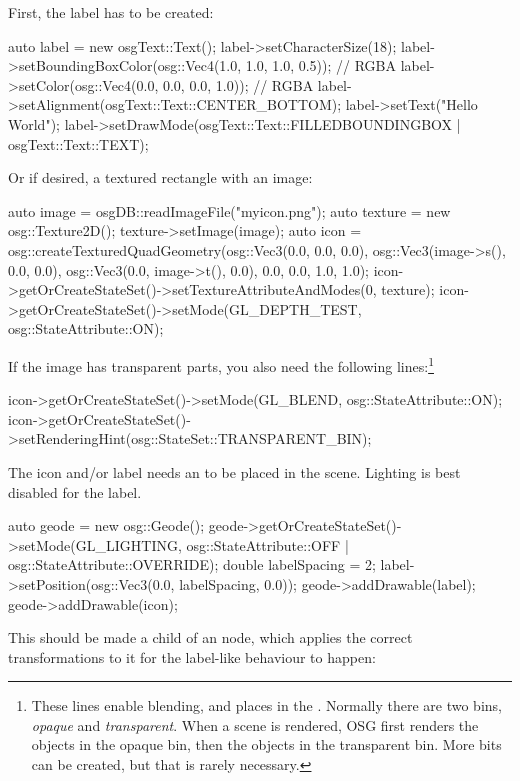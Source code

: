 First, the label has to be created:

\begin{cpp}
auto label = new osgText::Text();
label->setCharacterSize(18);
label->setBoundingBoxColor(osg::Vec4(1.0, 1.0, 1.0, 0.5)); // RGBA
label->setColor(osg::Vec4(0.0, 0.0, 0.0, 1.0)); // RGBA
label->setAlignment(osgText::Text::CENTER_BOTTOM);
label->setText("Hello World");
label->setDrawMode(osgText::Text::FILLEDBOUNDINGBOX | osgText::Text::TEXT);
\end{cpp}

Or if desired, a textured rectangle with an image:

\begin{cpp}
auto image = osgDB::readImageFile("myicon.png");
auto texture = new osg::Texture2D();
texture->setImage(image);
auto icon = osg::createTexturedQuadGeometry(osg::Vec3(0.0, 0.0, 0.0),
    osg::Vec3(image->s(), 0.0, 0.0), osg::Vec3(0.0, image->t(), 0.0),
    0.0, 0.0, 1.0, 1.0);
icon->getOrCreateStateSet()->setTextureAttributeAndModes(0, texture);
icon->getOrCreateStateSet()->setMode(GL_DEPTH_TEST, osg::StateAttribute::ON);
\end{cpp}

If the image has transparent parts, you also need the following lines:\footnote{These lines
enable blending, and places  in the . Normally there are
two bins, \textit{opaque} and \textit{transparent}. When a scene is rendered, OSG first
renders the objects in the opaque bin, then the objects in the transparent bin. More bits
can be created, but that is rarely necessary.}

\begin{cpp}
icon->getOrCreateStateSet()->setMode(GL_BLEND, osg::StateAttribute::ON);
icon->getOrCreateStateSet()->setRenderingHint(osg::StateSet::TRANSPARENT_BIN);
\end{cpp}

The icon and/or label needs an  to be placed in the scene.
Lighting is best disabled for the label.

\begin{cpp}
auto geode = new osg::Geode();
geode->getOrCreateStateSet()->setMode(GL_LIGHTING,
            osg::StateAttribute::OFF | osg::StateAttribute::OVERRIDE);
double labelSpacing = 2;
label->setPosition(osg::Vec3(0.0, labelSpacing, 0.0));
geode->addDrawable(label);
geode->addDrawable(icon);
\end{cpp}

This  should be made a child of an 
node, which applies the correct transformations to it for the label-like behaviour
to happen:

